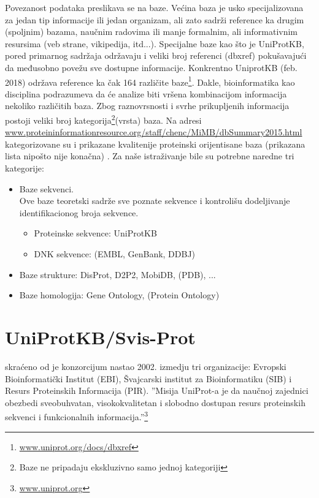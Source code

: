 Povezanost podataka preslikava se na baze. Većina baza je usko specijalizovana
za jedan tip informacije ili jedan organizam, ali zato sadrži reference ka
drugim (spoljnim) bazama, naučnim radovima ili  manje formalnim, ali
informativnim resursima (veb strane, vikipedija, itd...). Specijalne baze kao
što je UniProtKB, pored primarnog sadržaja održavaju i veliki broj referenci
(dbxref) pokušavajući da međusobno povežu sve dostupne informacije. Konkrentno
UniprotKB (feb. 2018) održava reference ka čak 164 različite
baze\footnote{\url{www.uniprot.org/docs/dbxref}}.  Dakle, bioinformatika kao
disciplina podrazumeva da će analize biti vršena kombinacijom informacija
nekoliko različitih baza.  Zbog raznovrsnosti i svrhe prikupljenih informacija
postoji veliki broj kategorija\footnote{Baze ne pripadaju ekskluzivno samo
jednoj kategoriji}(vrsta) baza.  Na adresi
\url{www.proteininformationresource.org/staff/chenc/MiMB/dbSummary2015.html}
kategorizovane su i prikazane kvalitenije proteinski orijentisane baza
(prikazana lista nipošto nije konačna) \parencite{Chen2017}. Za naše
istraživanje bile su potrebne naredne tri kategorije:

\begin{itemize}
  \item Baze sekvenci.\\ 
        Ove baze teoretski sadrže sve poznate sekvence i kontrolišu dodeljivanje 
        identifikacionog broja sekvence.
    \begin{itemize}
      \item Proteinske sekvence: UniProtKB
      \item DNK sekvence: (EMBL, GenBank, DDBJ)
    \end{itemize}
  \item Baze strukture: DisProt, D2P2, MobiDB, (PDB), ...
  \item Baze homologija: Gene Ontology, (Protein Ontology)
\end{itemize}


\section{UniProtKB/Svis-Prot}
\label{svis-prot}

 skraćeno od  je konzorcijum
nastao 2002. izmedju tri organizacije: Evropski Bioinformatički
Institut (EBI), Švajcarski institut za Bioinformatiku (SIB) i Resurs
Proteinskih Informacija (PIR).  ''Misija UniProt-a je da naučnoj zajednici
obezbedi sveobuhvatan, visokokvalitetan i slobodno dostupan resurs proteinskih
sekvenci i funkcionalnih informacija.''\footnote{\url{www.uniprot.org}} 


